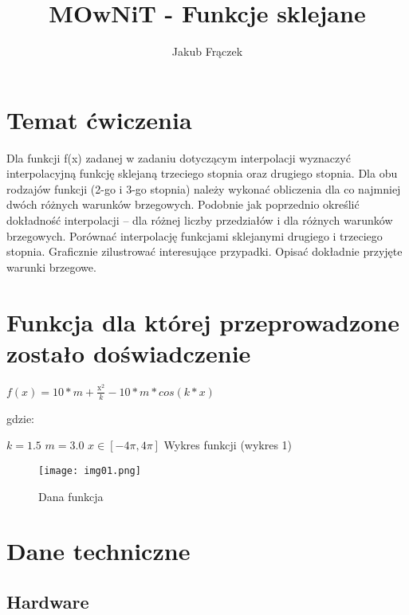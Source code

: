 \documentclass{article}
\title{MOwNiT - Funkcje sklejane}
\author{Jakub Frączek}
\begin{document}
\maketitle

\section{Temat ćwiczenia}

Dla funkcji f(x) zadanej w zadaniu dotyczącym interpolacji wyznaczyć interpolacyjną funkcję 
sklejaną trzeciego stopnia oraz drugiego stopnia. Dla obu rodzajów funkcji (2-go i 3-go 
stopnia) należy wykonać obliczenia dla co najmniej dwóch różnych warunków brzegowych.  
Podobnie jak poprzednio określić dokładność interpolacji – dla różnej liczby przedziałów i 
dla różnych warunków brzegowych.  
Porównać interpolację funkcjami sklejanymi drugiego i trzeciego stopnia. Graficznie 
zilustrować interesujące przypadki.  
Opisać dokładnie przyjęte warunki brzegowe. 

\section{Funkcja dla której przeprowadzone zostało doświadczenie}

\begin{center}
\(f(x) = 10 * m + \frac{\mathrm{x}_{}^{2}}{k} - 10 * m * cos(k*x)\)
\end{center}

\noindent
gdzie:

\bigbreak

\(k = 1.5\)
\newline \indent
\(m = 3.0\)
\newline \indent
\(x \in [-4\pi, 4\pi]\)
\bigbreak
Wykres funkcji (wykres 1)

\begin{figure}[H]
  \centering
  \begin{minipage}[b]{0.4\textwidth}
    \texttt{[image: img01.png]}
    \caption{Dana funkcja}
  \end{minipage}
\end{figure}

\section{Dane techniczne}

\subsection{Hardware}
\end{document}
